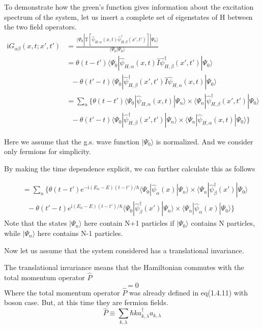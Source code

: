 To demonstrate how the green's function gives information about the excitation spectrum of the system, let us insert a complete set of eigenstates of H between the two field operators.
\begin{align}\label{2.3.7}
\mathrm{i}G_{\alpha\beta}(x,t;x',t')&=\frac{\langle\Psi_0|\mathrm{T}[\hat \psi_{H,\alpha}(x,t)\hat \psi^{
\dagger}_{H,\beta}(x',t')]|\Psi_0\rangle}{\langle\Psi_0|\Psi_0\rangle} \nonumber \\
&=\theta(t-t')\langle\Psi_0|\hat \psi_{H,\alpha}(x,t)\hat{I}\hat \psi^{
\dagger}_{H,\beta} (x',t')|\Psi_0\rangle \nonumber \\
& \ \ \ -\theta(t'-t)\langle\Psi_0|\hat \psi^{
\dagger}_{H,\beta}(x',t')\hat{I}\hat \psi_{H,\alpha} (x,t)|\Psi_0\rangle \nonumber \\
&=\sum_n\{\theta(t-t')\langle\Psi_0|\hat \psi_{H,\alpha}(x,t)|\Psi_n\rangle\times\langle\Psi_n|\hat \psi^{
\dagger}_{H,\beta} (x',t')|\Psi_0\rangle \nonumber \\
& \ \ \ -\theta(t'-t)\langle\Psi_0|\hat \psi^{
\dagger}_{H,\beta}(x',t')|\Psi_n\rangle\times\langle\Psi_n|\hat \psi_{H,\alpha} (x,t)|\Psi_0\rangle\}
\end{align}

Here we assume that the g.s. wave function $|\Psi_0\rangle$ is normalized. And we consider only fermions for simplicity.

By making the time dependence explicit, we can further calculate this as follows

\begin{align}
&=\sum_n\{\theta(t-t')e^{-\mathrm{i}(E_n-E)(t-t')/\hbar}\langle\Psi_0|\hat \psi_{\alpha}(x)|\Psi_n\rangle\times\langle\Psi_n|\hat \psi^{
\dagger}_{\beta} (x')|\Psi_0\rangle \nonumber \\
& \ \ \ -\theta(t'-t)e^{\mathrm{i}(E_n-E)(t-t')/\hbar}\langle\Psi_0|\hat \psi^{
\dagger}_{\beta}(x')|\Psi_n\rangle\times\langle\Psi_n|\hat \psi_{\alpha} (x)|\Psi_0\rangle\} \nonumber
\end{align}
Note that the states $|\Psi_n\rangle$ here contain N+1 particles if $|\Psi_0\rangle$ contains N particles, while $|\Psi_n\rangle$ here contains N-1 particles.

Now let us assume that the system considered has a translational invariance.

The translational invariance means that the Hamiltonian commutes with the total momentum operator $\hat{P}$
\begin{equation}
[\hat{H},\hat{P}]=0\label{2.3.8}
\end{equation}
Where the total momentum operator $\hat{P}$ was already defined in eq(1.4.11) with boson case. But, at this time they are fermion fields.
\begin{equation}
\hat{P}\equiv \sum_{k,\lambda} \hbar k a^{\dagger}_{k,\lambda} a_{k,\lambda} \nonumber
\end{equation}

